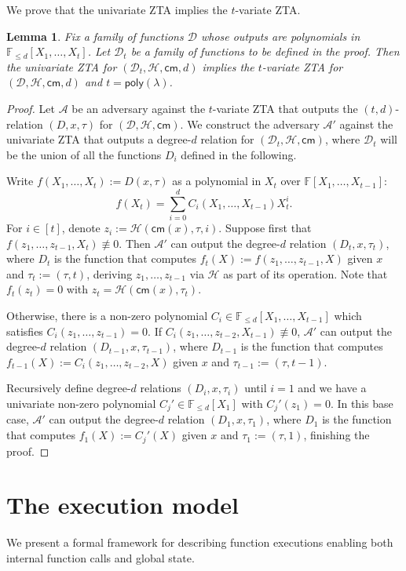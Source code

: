 \documentclass[11pt]{article} %
\newcommand{\F}{\ensuremath{\mathbb F}\xspace}
\newcommand{\adv}{\ensuremath{\mathcal A}\xspace}
\newcommand{\advprime}{\ensuremath{\mathcal{A}'}\xspace}
\newcommand{\cm}{\ensuremath{\mathsf{cm}}\xspace}
\newcommand{\defeq}{:=}
\newcommand{\hash}{\ensuremath{\mathcal{H}}\xspace}
\newtheorem{lemma}{Lemma}[section]
\newcommand{\poly}{\ensuremath{\mathsf{poly(\lambda)}}\xspace}
\newcommand{\ztafuncs}{\ensuremath{\mathcal{D}}\xspace}
\begin{document}
We prove that the univariate ZTA implies the $t$-variate ZTA.

\begin{lemma}
Fix a family of functions \ztafuncs whose outputs are polynomials in $\F_{\leq d}[X_1,\ldots,X_t]$. Let $\ztafuncs_t$ be a family of functions to be defined in the proof. Then the univariate ZTA for $(\ztafuncs_t,\hash,\cm,d)$ implies the $t$-variate ZTA for $(\ztafuncs,\hash,\cm,d)$ and $t=\poly$.
\end{lemma}
\begin{proof}
Let \adv be an adversary against the $t$-variate ZTA that outputs the $(t,d)$-relation $(D,x,\tau)$ for $(\ztafuncs,\hash,\cm)$. We construct the adversary \advprime against the univariate ZTA that outputs a degree-$d$ relation for $(\ztafuncs_t,\hash,\cm)$, where $\ztafuncs_t$ will be the union of all the functions $D_i$ defined in the following.

Write $f(X_1,\ldots,X_t)\defeq D(x,\tau)$ as a polynomial in $X_t$ over $\F[X_1,\ldots,X_{t-1}]$:
\[f(X_t)=\sum_{i=0}^d C_i(X_1,\ldots,X_{t-1}) X_t^i.\]
For $i\in[t]$, denote $z_i\defeq\hash(\cm(x),\tau,i)$. Suppose first that $f(z_1,\ldots,z_{t-1},X_t)\not\equiv 0$. Then \advprime can output the degree-$d$ relation $(D_t,x,\tau_t)$, where $D_t$ is the function that computes $f_t(X)\defeq f(z_1,\ldots,z_{t-1},X)$ given $x$ and $\tau_t\defeq(\tau,t)$, deriving $z_1,\ldots,z_{t-1}$ via \hash as part of its operation. Note that $f_t(z_t)=0$ with $z_t=\hash(\cm(x),\tau_t)$.

Otherwise, there is a non-zero polynomial $C_i\in\F_{\leq d}[X_1,\ldots,X_{t-1}]$ which satisfies $C_i(z_1,\ldots,z_{t-1})=0$. If $C_i(z_1,\ldots,z_{t-2},X_{t-1})\not\equiv 0$, \advprime can output the degree-$d$ relation $(D_{t-1},x,\tau_{t-1})$, where $D_{t-1}$ is the function that computes $f_{t-1}(X)\defeq C_i(z_1,\ldots,z_{t-2},X)$ given $x$ and $\tau_{t-1}\defeq(\tau,t-1)$.

Recursively define degree-$d$ relations $(D_i,x,\tau_i)$ until $i=1$ and we have a univariate non-zero polynomial $C_j'\in\F_{\leq d}[X_1]$ with $C_j'(z_1)=0$. In this base case, \advprime can output the degree-$d$ relation $(D_1,x,\tau_1)$, where $D_1$ is the function that computes $f_1(X)\defeq C_j'(X)$ given $x$ and $\tau_1\defeq(\tau,1)$, finishing the proof.
\end{proof}

\section{The execution model}\label{sec:model}
We present a formal framework for describing function executions enabling both internal function calls and global state.
\end{document}
